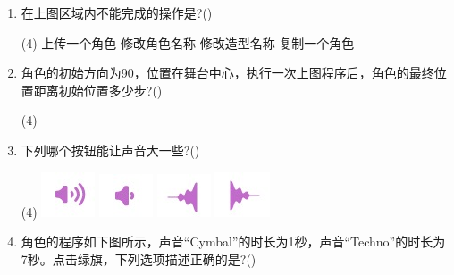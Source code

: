 \documentclass[10pt, a4paper]{article}
\begin{document}
\begin{enumerate}
        \item 在上图区域内不能完成的操作是?(\qquad)
        \begin{tasks}(4)
            \task 上传一个角色
            \task 修改角色名称
            \task 修改造型名称
            \task 复制一个角色
        \end{tasks}

        \item 角色的初始方向为90，位置在舞台中心，执行一次上图程序后，角色的最终位置距离初始位置多少步?(\qquad)
        \begin{tasks}(4)
        \end{tasks}

        \item 下列哪个按钮能让声音大一些?(\qquad)
        \begin{tasks}(4)
            \task \includegraphics[width=.05\textwidth]{18a.jpg}
            \task \includegraphics[width=.05\textwidth]{18b.jpg}
            \task \includegraphics[width=.05\textwidth]{18c.jpg}
            \task \includegraphics[width=.05\textwidth]{18d.jpg}
        \end{tasks}

        \item 角色的程序如下图所示，声音“Cymbal”的时长为1秒，声音“Techno”的时长为7秒。点击绿旗，下列选项描述正确的是?(\qquad)
        

\end{enumerate}
\end{document}
